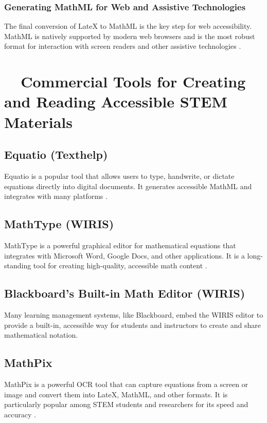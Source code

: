 \subsubsection{Generating MathML for Web and Assistive Technologies}\label{ch11:sssec:marker-mathml}
The final conversion of \gls{LateX} to \gls{MathML} is the key step for web accessibility. \gls{MathML} is natively supported by modern web browsers and is the most robust format for interaction with screen readers and other assistive technologies \supercite{W3CMathMLWeb}.

\section{~~Commercial Tools for Creating and Reading Accessible STEM Materials}\label{ch11:sec:commercial-tools}
\subsection{Equatio (Texthelp)}\label{ch11:ssec:equatio}
Equatio is a popular tool that allows users to type, handwrite, or dictate equations directly into digital documents. It generates accessible \gls{MathML} and integrates with many platforms \supercite{TexthelpEquatio, EquatioPricing}.

\subsection{MathType (WIRIS)}\label{ch11:ssec:mathtype}
MathType is a powerful graphical editor for mathematical equations that integrates with Microsoft Word, Google Docs, and other applications. It is a long-standing tool for creating high-quality, accessible math content \supercite{WIRISMathType, WIRISMathTypeFeatures}.

\subsection{Blackboard's Built-in Math Editor (WIRIS)}\label{ch11:ssec:blackboard-wiris}
Many learning management systems, like Blackboard, embed the WIRIS editor to provide a built-in, accessible way for students and instructors to create and share mathematical notation.

\subsection{MathPix}\label{ch11:ssec:MathPix}
MathPix is a powerful \gls{OCR} tool that can capture equations from a screen or image and convert them into \gls{LateX}, \gls{MathML}, and other formats. It is particularly popular among STEM students and researchers for its speed and accuracy \supercite{MathPix, MathpixSnip}.

